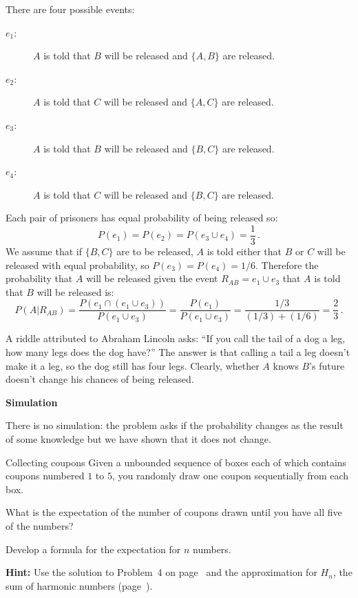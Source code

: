 There are four possible events:
\begin{description}
\item[$e_1$:] $A$ is told that $B$ will be released and $\{A,B\}$ are released. 
\item[$e_2$:] $A$ is told that $C$ will be released and $\{A,C\}$ are released. 
\item[$e_3$:] $A$ is told that $B$ will be released and $\{B,C\}$ are released. 
\item[$e_4$:] $A$ is told that $C$ will be released and $\{B,C\}$ are released. 
\end{description}
Each pair of prisoners has equal probability of being released so:
\[
P(e_1)=P(e_2)=P(e_3\cup e_4)=\frac{1}{3}\,.
\]
We assume that if $\{B,C\}$ are to be released, $A$ is told either that $B$ or $C$ will be released with equal probability, so $P(e_3)=P(e_4)=1/6$. Therefore the probability that $A$ will be released given the event $R_{AB}=e_1\cup e_3$ that $A$ is told that $B$ will be released is:
\[
P(A|R_{AB}) = \frac{P(e_1\cap(e_1\cup e_3))}{P(e_1\cup e_3)}=\frac{P(e_1)}{P(e_1\cup e_3)}=\frac{1/3}{(1/3)+(1/6)}=\frac{2}{3}\,.
\]


A riddle attributed to Abraham Lincoln asks: ``If you call the tail of a dog a leg, how many legs does the dog have?'' The answer is that calling a tail a leg doesn't make it a leg, so the dog still has four legs. Clearly, whether $A$ knows $B$'s future doesn't change his chances of being released.

\textbf{Simulation}

There is no simulation: the problem asks if the probability changes as the result of some knowledge but we have shown that it does not change.


\begin{prob}{Collecting coupons}
Given a unbounded sequence of boxes each of which contains coupons numbered $1$ to $5$, you randomly draw one coupon sequentially from each box.

 What is the expectation of the number of coupons drawn until you have all five of the numbers?

 Develop a formula for the expectation for $n$ numbers.

\textbf{Hint:} Use the solution to Problem~4 on page~\pageref{p.four} and the approximation for $H_n$, the sum of harmonic numbers (page~\pageref{p.harmonic}).
\end{prob}

